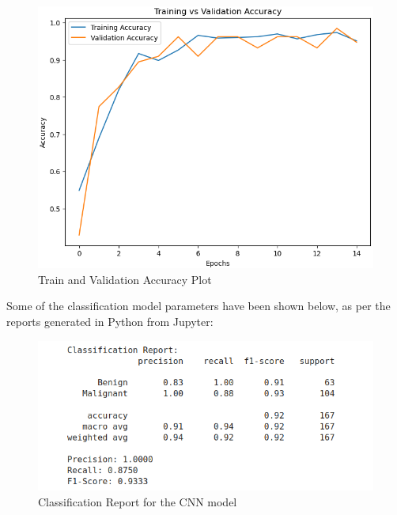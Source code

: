     \begin{figure}[H]
        \centering
        \includegraphics[width=1\linewidth]{images/trainValAcc.png}
        \caption{Train and Validation Accuracy Plot}
        \label{fig:enter-label}
    \end{figure}

    \noindent
    Some of the classification model parameters have been shown below, as per the reports generated in Python from Jupyter:

    \begin{figure}[H]
        \centering
        \includegraphics[width=1\linewidth]{images/classificationReport.png}
        \caption{Classification Report for the CNN model}
        \label{fig:enter-label}
    \end{figure}

